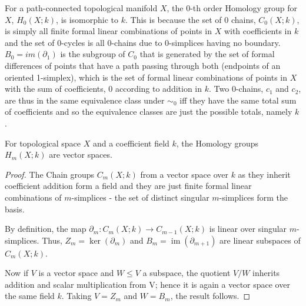 \begin{remark}
For a path-connected topological manifold $X$, the $0$-th order Homology group for $X$, $H_0(X;k)$, is isomorphic to $k$. This is because the set of $0$ chains, $C_0(X;k)$, is simply all finite formal linear combinations of points in $X$ with coefficients in $k$ and the set of $0$-cycles is all $0$-chains due to $0$-simplices having no boundary. $B_0 = im(\partial_1)$ is the subgroup of $C_0$ that is generated by the set of formal differences of points that have a path passing through both (endpoints of an oriented 1-simplex), which is the set of formal linear combinations of points in $X$ with the sum of coefficients, $0$ according to addition in $k$. Two $0$-chains, $c_1$ and $c_2$, are thus in the same equivalence class under $\sim_0$ iff they have the same total sum of coefficients and so the equivalence classes are just the possible totals, namely $k$.
\end{remark}

\begin{lemma}\label{lem:A1}
For topological space $X$ and a coefficient field $k$, the Homology groups $H_m(X;k)$ are vector spaces.
\end{lemma}
\begin{proof}
The Chain groups $C_m(X;k)$ from a vector space over $k$ as they inherit coefficient addition form a field and they are just finite formal linear combinations of $m$-simplices - the set of distinct singular $m$-simplices form the basis.

By definition, the map $\partial_m:C_{m}(X;k)\longrightarrow C_{m-1}(X;k)$ is linear over singular $m$-simplices. Thus, $Z_m = \ker(\partial_m)$ and $B_m=\operatorname{im}(\partial_{m+1})$ are linear subspaces of $C_m(X;k)$.

Now if $V$ is a vector space and $W\leq V$ a subspace, the quotient $V/W$ inherits addition and scalar multiplication from V; hence it is again a vector space over the same field $k$. Taking $V=Z_m$ and $W=B_m$, the result follows.
\end{proof}
